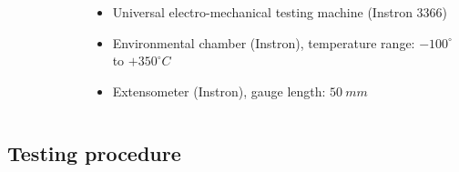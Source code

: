 \documentclass[first,firstsupp,lastsupp,last,hyperref,table]{ETHclass}
\begin{document}
\begin{frame}
\begin{columns}[c]
\begin{column}{0.5\textwidth}
\begin{figure}
\end{figure}
\end{column}
\begin{column}{0.5\textwidth}
\centering
\scriptsize
\begin{itemize}[label=]
\item Universal electro-mechanical testing machine (Instron 3366)
\item Environmental chamber (Instron), temperature range: $-100^{\circ}$ to $+350^{\circ}C$
\item Extensometer (Instron), gauge length: $50\ mm$
\end{itemize}
\end{column}
\end{columns}
\end{frame}

\subsection{Testing procedure}
\end{document}
